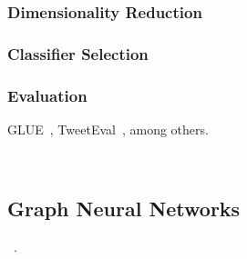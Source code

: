 \subsubsection{Dimensionality Reduction}
\subsubsection{Classifier Selection}
\subsubsection{Evaluation}
GLUE~\autocite{wang18glue}, TweetEval~\autocite{tweeteval}, among others.

~\autocite{kowsari19tc,li20tc,devlin18bert,howard18tc}


\subsection{Graph Neural Networks}\label{sec:GNN}
~\autocite{zhou20gnn,wu21gnn,zhang18dlongraphs,sun18adversarial}.